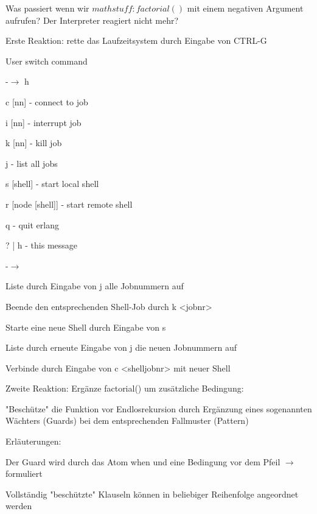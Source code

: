 \documentclass[10pt]{article}
\begin{document}
Was passiert wenn wir $mathstuff:factorial()$ mit einem negativen Argument aufrufen? Der Interpreter reagiert nicht mehr?
\begin{itemize*}
  \item Erste Reaktion: rette das Laufzeitsystem durch Eingabe von CTRL-G
  \begin{itemize*}
    \item User switch command
    \begin{enumerate*}
      \item -$\rightarrow$ h
      \item  c [nn] - connect to job
      \item i [nn] - interrupt job
      \item k [nn] - kill job
      \item j - list all jobs
      \item s [shell] - start local shell
      \item r [node [shell]] - start remote shell
      \item q - quit erlang
      \item ? | h - this message
      \item -$\rightarrow$
    \end{enumerate*}
    \item Liste durch Eingabe von j alle Jobnummern auf
    \item Beende den entsprechenden Shell-Job durch k <jobnr>
    \item Starte eine neue Shell durch Eingabe von s
    \item Liste durch erneute Eingabe von j die neuen Jobnummern auf
    \item Verbinde durch Eingabe von c <shelljobnr> mit neuer Shell
  \end{itemize*}
  \item Zweite Reaktion: Ergänze factorial() um zusätzliche Bedingung:
  \begin{itemize*}
    \item "Beschütze" die Funktion vor Endlosrekursion durch Ergänzung eines sogenannten Wächters (Guards) bei dem entsprechenden Fallmuster  (Pattern)
    \item Erläuterungen:
    \begin{itemize*}
      \item Der Guard wird durch das Atom when und eine Bedingung vor dem Pfeil $\rightarrow$ formuliert
      \item Vollständig "beschützte" Klauseln können in beliebiger Reihenfolge angeordnet werden

\end{itemize*}
\end{itemize*}
\end{itemize*}
\end{document}
